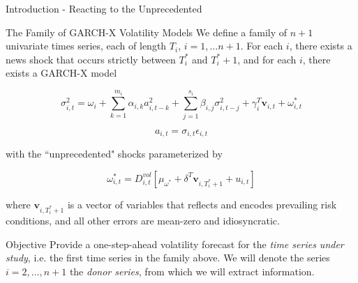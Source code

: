 \documentclass{beamer} %
\newcommand{\x}{\textbf{v}}
\begin{document}
\begin{frame}[t]
\begin{columns}[t]
\begin{column}{0.465\textwidth}
\begin{block}{Introduction - Reacting to the Unprecedented}
\end{block}

            
\begin{block}{The Family of GARCH-X Volatility Models}
	We define a family of $n+1$ univariate times series, each of length $T_{i}$, $i=1,...n+1$.  For each $i$, there exists a news shock that occurs strictly between $T^{*}_{i}$ and $T^{*}_{i}+1$, and for each $i$, there exists a GARCH-X model

	\bigskip %




			  \begin{equation} \sigma^{2}_{i,t} = \omega_{i} + \sum^{m_{i}}_{k=1}\alpha_{i,k}a^{2}_{i,t-k} + \sum_{j=1}^{s_{i}}\beta_{i,j}\sigma_{i,t-j}^{2} + \gamma_{i}^{T} \x_{i,t} + \omega^{*}_{i,t}
			  \end{equation}
		  
			  \begin{equation}a_{i,t} = \sigma_{i,t}\epsilon_{i,t} 
			  \end{equation}

with the ``unprecedented" shocks parameterized by

\begin{equation}\omega_{i,t}^{*} = D^{vol}_{i,t}[\mu_{\omega^{*}}+\delta^{T}\x_{i,T^{*}_{i}+1}+ u_{i,t}]
\end{equation}

where $\x_{i,T^{*}_{i}+1}$ is a vector of variables that reflects and encodes prevailing risk conditions, and all other errors are mean-zero and idiosyncratic.


	\end{block}



\begin{block}{Objective}
Provide a one-step-ahead volatility forecast for the \textit{time series under study}, i.e. the first time series in the family above.  We will denote the series $i=2,...,n+1$ the \textit{donor series}, from which we will extract information.
\end{block}


\end{column}
\end{columns}
\end{frame}
\end{document}
